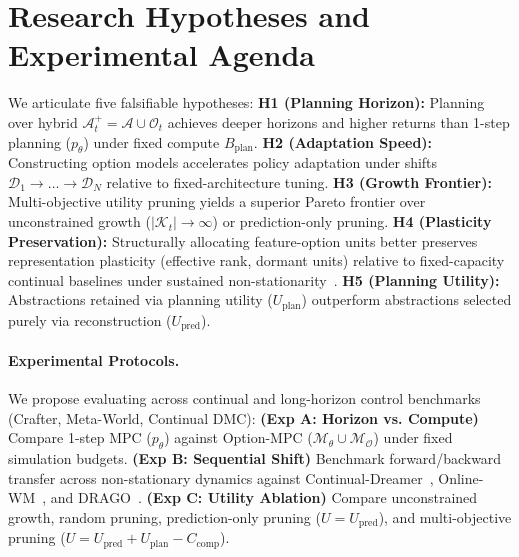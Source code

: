 \documentclass{article}
\theoremstyle{definition}
\begin{document}
\section{Research Hypotheses and Experimental Agenda}
\label{sec:hypotheses}

We articulate five falsifiable hypotheses:
\textbf{H1 (Planning Horizon):} Planning over hybrid $\mathcal{A}^+_t = \mathcal{A} \cup \mathcal{O}_t$ achieves deeper horizons and higher returns than 1-step planning ($p_\theta$) under fixed compute $B_{\text{plan}}$.
\textbf{H2 (Adaptation Speed):} Constructing option models accelerates policy adaptation under shifts $\mathcal{D}_1 \to \dots \to \mathcal{D}_N$ relative to fixed-architecture tuning.
\textbf{H3 (Growth Frontier):} Multi-objective utility pruning yields a superior Pareto frontier over unconstrained growth ($|\mathcal{K}_t| \to \infty$) or prediction-only pruning.
\textbf{H4 (Plasticity Preservation):} Structurally allocating feature-option units better preserves representation plasticity (effective rank, dormant units) relative to fixed-capacity continual baselines under sustained non-stationarity~\citep{dohare2024loss}.
\textbf{H5 (Planning Utility):} Abstractions retained via planning utility ($U_{\text{plan}}$) outperform abstractions selected purely via reconstruction ($U_{\text{pred}}$).

\paragraph{Experimental Protocols.}
We propose evaluating across continual and long-horizon control benchmarks (Crafter, Meta-World, Continual DMC):
\textbf{(Exp A: Horizon vs. Compute)} Compare 1-step MPC ($p_\theta$) against Option-MPC ($\mathcal{M}_\theta \cup \mathcal{M}_{\mathcal{O}}$) under fixed simulation budgets.
\textbf{(Exp B: Sequential Shift)} Benchmark forward/backward transfer across non-stationary dynamics against Continual-Dreamer~\citep{kessler2023effectiveness}, Online-WM~\citep{liu2025continual}, and DRAGO~\citep{fu2025knowledge}.
\textbf{(Exp C: Utility Ablation)} Compare unconstrained growth, random pruning, prediction-only pruning ($U = U_{\text{pred}}$), and multi-objective pruning ($U = U_{\text{pred}} + U_{\text{plan}} - C_{\text{comp}}$).

\end{document}

